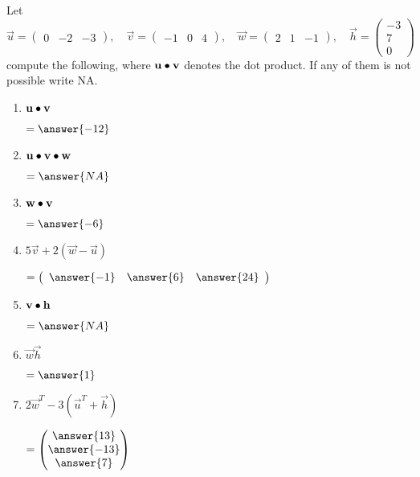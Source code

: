 \documentclass{ximera}
\author{Parisa Fatheddin}
\begin{document}
\begin{exercise}
Let
\[
\vec{u} =
\begin{pmatrix}
0 & -2& -3
\end{pmatrix}
, \quad
\vec{v} = \begin{pmatrix}
  -1 & 0 & 4
\end{pmatrix},
\quad \vec{w} = \begin{pmatrix} 2 & 1 & -1 \end{pmatrix}
, \quad \vec{h} = \begin{pmatrix} -3\\
7\\
0
\end{pmatrix}
\]
compute the following, where $\mathbf{u}\bullet \mathbf{v}$ denotes the dot product. If any of them is not possible write NA.
\begin{enumerate}
\item $\mathbf{u}\bullet \mathbf{v}$ \begin{prompt}$= \answer{-12}$\end{prompt}
\item $\mathbf{u}\bullet \mathbf{v} \bullet\mathbf{w} $\begin{prompt} $= \answer{NA}$\end{prompt}
\item $\mathbf{w}\bullet \mathbf{v} $\begin{prompt} $=\answer{-6}$\end{prompt}
\item $5 \vec{v} + 2\left(\vec{w}-\vec{u}\right)$ \begin{prompt} $= \left(\begin{array}{ccc} \answer{-1} & \answer{6} & \answer{24}
\end{array}\right)$ \end{prompt}
\item $\mathbf{v} \bullet \mathbf{h}$ \begin{prompt}$= \answer{NA}$\end{prompt}
\item $\vec{w}\vec{h}$ \begin{prompt} $= \answer{1}$\end{prompt}
\item $2 \vec{w}^{T} - 3\left(\vec{u}^{T} + \vec{h}\right)$\begin{prompt}$= \begin{pmatrix} \answer{13} \\
\answer{-13}\\
\answer{7}
  \end{pmatrix}$\end{prompt}
\end{enumerate}
\end{exercise}
\end{document}
